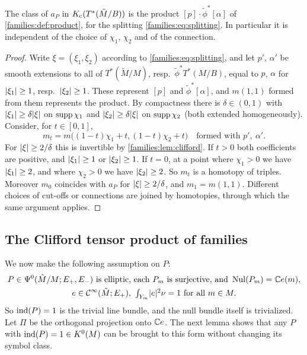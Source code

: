 \begin{lemma}\label{families:lem:aP-product}
  The class of $a_P$ in $K_{\mathrm{c}}(T^*(\tilde M/B))$ is the product
  $[p]\cdot\tilde\phi^*[\alpha]$ of \cref{families:def:product}, for the
  splitting \eqref{families:eq:splitting}. In particular it is independent of
  the choice of $\chi_1$, $\chi_2$ and of the connection.
\end{lemma}
\begin{proof}
  Write $\xi=(\xi_1,\xi_2)$ according to \eqref{families:eq:splitting}, and let
  $p'$, $\alpha'$ be smooth extensions to all of $T^*(\tilde M/M)$, resp.\
  $\tilde\phi^*T^*(M/B)$, equal to $p$, $\alpha$ for $\lvert \xi_1\rvert\ge1$, resp.\
  $\lvert \xi_2\rvert\ge1$. These represent $[p]$ and $\tilde\phi^*[\alpha]$, and
  $m(1,1)$ formed from them represents the product. By compactness there is
  $\delta\in(0,1)$ with $\lvert \xi_1\rvert\ge\delta\lvert \xi\rvert$ on $\operatorname{supp}\chi_1$ and
  $\lvert \xi_2\rvert\ge\delta\lvert \xi\rvert$ on $\operatorname{supp}\chi_2$ (both extended homogeneously).
  Consider, for $t\in[0,1]$,
  \begin{equation*}
    m_t=m\bigl((1-t)\chi_1+t,(1-t)\chi_2+t\bigr)\quad\text{formed with }p',\
    \alpha'.
  \end{equation*}
  For $\lvert \xi\rvert\ge2/\delta$ this is invertible by \cref{families:lem:clifford}.
  If $t>0$ both coefficients are positive, and $\lvert \xi_1\rvert\ge1$ or
  $\lvert \xi_2\rvert\ge1$. If $t=0$, at a point where $\chi_1>0$ we have
  $\lvert \xi_1\rvert\ge2$, and where $\chi_2>0$ we have $\lvert \xi_2\rvert\ge2$. So $m_t$
  is a homotopy of triples. Moreover $m_0$ coincides with $a_P$ for
  $\lvert \xi\rvert\ge2/\delta$, and $m_1=m(1,1)$. Different choices of cut-offs or
  connections are joined by homotopies, through which the same argument
  applies.
\end{proof}

\subsection{The Clifford tensor product of families}
We now make the following assumption on $P$:
\begin{equation}\label{families:eq:H}
  \begin{gathered}
    P\in\Psi^{0}(\tilde M/M;E_+,E_-)\text{ is elliptic, each }P_m\text{ is
    surjective, and }\operatorname{Nul}(P_m)=\mathbb{C} e(m),\\
    e\in\mathcal{C}^\infty(\tilde M;E_+),\ \textstyle\int_{Y_m}\lvert e\rvert^2\nu=1\text{ for all }
    m\in M.
  \end{gathered}
\end{equation}
So $\operatorname{ind}(P)=1$ is the trivial line bundle, and the null bundle itself is
trivialized. Let $\Pi$ be the orthogonal projection onto $\mathbb{C} e$. The next
lemma shows that any $P$ with $\operatorname{ind}(P)=1\in K^0(M)$ can be brought to this
form without changing its symbol class.

